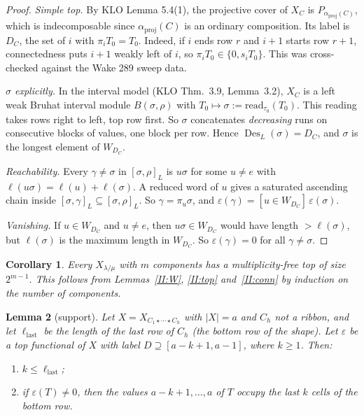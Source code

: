 \documentclass[11pt]{amsart}
\newcommand{\Des}{\operatorname{Des}}
\theoremstyle{plain}
\newtheorem{lemmaII}{Lemma}
\newtheorem{corII}[lemmaII]{Corollary}
\theoremstyle{definition}
\begin{document}
\begin{proof}
\emph{Simple top.} By KLO Lemma 5.4(1), the projective cover of $X_C$ is $P_{\alpha_{\mathrm{proj}}(C)}$, which is indecomposable since $\alpha_{\mathrm{proj}}(C)$ is an ordinary composition. Its label is $D_C$, the set of $i$ with $\pi_iT_0=T_0$. Indeed, if $i$ ends row $r$ and $i+1$ starts row $r+1$, connectedness puts $i+1$ weakly left of $i$, so $\pi_iT_0\in\{0,s_iT_0\}$. This was cross-checked against the Wake 289 sweep data.

\emph{$\sigma$ explicitly.} In the interval model (KLO Thm.~3.9, Lemma~3.2), $X_C$ is a left weak Bruhat interval module $B(\sigma,\rho)$ with $T_0\mapsto\sigma:=\mathrm{read}_{\tau_0}(T_0)$. This reading takes rows right to left, top row first. So $\sigma$ concatenates \emph{decreasing} runs on consecutive blocks of values, one block per row. Hence $\Des_L(\sigma)=D_C$, and $\sigma$ is the longest element of $W_{D_C}$.

\emph{Reachability.} Every $\gamma\ne\sigma$ in $[\sigma,\rho]_L$ is $u\sigma$ for some $u\ne e$ with $\ell(u\sigma)=\ell(u)+\ell(\sigma)$. A reduced word of $u$ gives a saturated ascending chain inside $[\sigma,\gamma]_L\subseteq[\sigma,\rho]_L$. So $\gamma=\pi_u\sigma$, and $\varepsilon(\gamma)=[u\in W_{D_C}]\,\varepsilon(\sigma)$.

\emph{Vanishing.} If $u\in W_{D_C}$ and $u\neq e$, then $u\sigma\in W_{D_C}$ would have length $>\ell(\sigma)$, but $\ell(\sigma)$ is the maximum length in $W_{D_C}$. So $\varepsilon(\gamma)=0$ for all $\gamma\ne\sigma$.
\end{proof}

\begin{corII}\label{II:mf}
Every $X_{\lambda/\mu}$ with $m$ components has a multiplicity-free top of size $2^{m-1}$. This follows from Lemmas~\ref{II:W}, \ref{II:top} and~\ref{II:conn} by induction on the number of components.
\end{corII}

\begin{lemmaII}[support]\label{II:support}
Let $X=X_{C_1\star\cdots\star C_h}$ with $|X|=a$ and $C_h$ not a ribbon, and let $\ell_{\mathrm{last}}$ be the length of the last row of $C_h$ (the bottom row of the shape). Let $\varepsilon$ be a top functional of $X$ with label $D\supseteq[a-k+1,a-1]$, where $k\ge1$. Then:
\begin{enumerate}[label=\textup{(\roman*)},itemsep=1pt]
\item $k\le\ell_{\mathrm{last}}$;
\item if $\varepsilon(T)\ne0$, then the values $a-k+1,\dots,a$ of $T$ occupy the last $k$ cells of the bottom row.
\end{enumerate}
\end{lemmaII}
\end{document}
